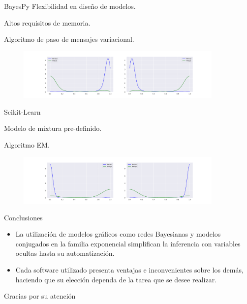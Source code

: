 \documentclass[aspectratio=169]{beamer}
\begin{document}
    \begin{frame}{BayesPy}
      Flexibilidad en diseño de modelos.

      Altos requisitos de memoria.

      Algoritmo de paso de mensajes variacional.
    \captionsetup[subfigure]{labelformat=empty}
     \begin{figure}[h]
       \centering
         \includegraphics[width=0.9\textwidth]{tex/images/proba_reduced_bayes.pdf}
     \end{figure}
    \end{frame}
    \begin{frame}{Scikit-Learn}

      Modelo de mixtura pre-definido.

      Algoritmo EM.

    \captionsetup[subfigure]{labelformat=empty}
     \begin{figure}[h]
       \centering
         \includegraphics[width=0.9\textwidth]{tex/images/proba_observed.pdf}
     \end{figure}
    \end{frame}


    \begin{frame}{Conclusiones}

      \begin{itemize}
        \item La utilización de modelos gráficos como redes Bayesianas y modelos conjugados en la familia exponencial simplifican la inferencia con variables ocultas hasta su automatización.
        \item Cada software utilizado presenta ventajas e inconvenientes sobre los demás, haciendo que su elección dependa de la tarea que se desee realizar.
      \end{itemize}
    \end{frame}

    \begin{frame}[standout]
      Gracias por su atención
    \end{frame}
\end{document}
